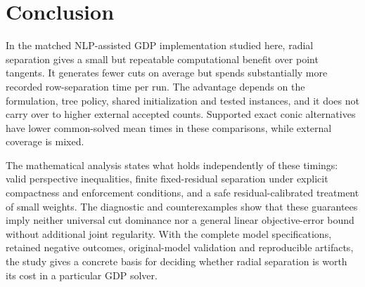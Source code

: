 \section{Conclusion}\label{sec:conclusion}
In the matched NLP-assisted GDP implementation studied here, radial separation gives a small but repeatable computational benefit over point tangents. It generates fewer cuts on average but spends substantially more recorded row-separation time per run. The advantage depends on the formulation, tree policy, shared initialization and tested instances, and it does not carry over to higher external accepted counts. Supported exact conic alternatives have lower common-solved mean times in these comparisons, while external coverage is mixed.

The mathematical analysis states what holds independently of these timings: valid perspective inequalities, finite fixed-residual separation under explicit compactness and enforcement conditions, and a safe residual-calibrated treatment of small weights. The diagnostic and counterexamples show that these guarantees imply neither universal cut dominance nor a general linear objective-error bound without additional joint regularity. With the complete model specifications, retained negative outcomes, original-model validation and reproducible artifacts, the study gives a concrete basis for deciding whether radial separation is worth its cost in a particular GDP solver.

